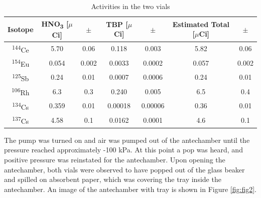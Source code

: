 \documentclass[11pt,notitlepage]{article}
\newcommand{\tss}{\textsuperscript}
\newcommand{\tsbs}{\textsubscript}
\begin{document}
\begin{table}[H]
  \begin{center}
    \caption{Activities in the two vials}
    
  \begin{tabular}{|c S[table-format=1.3] S[table-format=1.3] S[table-format=1.5] S[table-format=1.5] S[table-format=1.3] S[table-format=1.3]|}
    \hline
    Isotope
    & {HNO\tsbs{3} [$\mu$Ci]}
    & {$\pm$}
    & {TBP [$\mu$Ci]}
    & {$\pm$}
    & {Estimated Total [$\mu$Ci]}
    &  {$\pm$}
    \\
    \hline\hline
    \tss{144}Ce & 5.70 & 0.06 & 0.118 & 0.003 & 5.82 & 0.06\\
    \hline
    \tss{154}Eu & 0.054 & 0.002 & 0.0033 & 0.0002 & 0.057 & 0.002\\
    \hline
    \tss{125}Sb & 0.24 & 0.01 & 0.0007 & 0.0006 & 0.24 & 0.01\\
    \hline
    \tss{106}Rh & 6.3 & 0.3 & 0.240 & 0.005 & 6.5 & 0.4\\
    \hline
    \tss{134}Cs & 0.359 & 0.01 & 0.00018 & 0.00006 & 0.36 & 0.01\\
    \hline
    \tss{137}Cs & 4.58 & 0.1 & 0.0162 & 0.0001 & 4.6 & 0.1\\
    \hline
  \end{tabular}
  \label{fig:activities}
\end{center}
\end{table}

The pump was turned on and air was pumped out
of the antechamber
until the pressure reached approximately -100 kPa. At this
point a pop was heard, and positive pressure was reinstated
for the antechamber. Upon opening the antechamber, both
vials were observed to have popped out of the glass beaker and spilled on
absorbent paper, which was covering the
tray inside the antechamber. An image of the antechamber with
tray is shown in Figure \ref{fig:fig2}.
\end{document}
